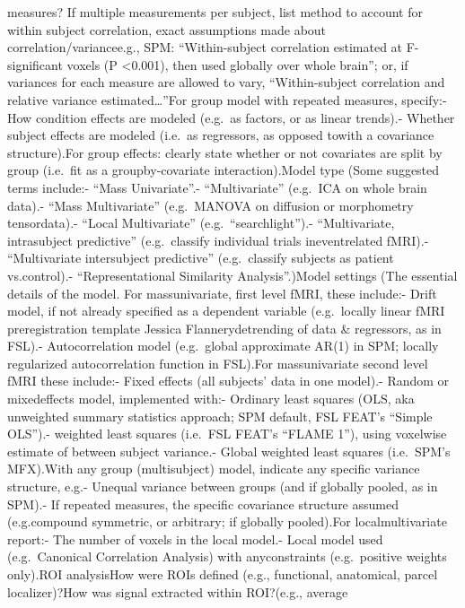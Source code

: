 \documentclass[]{article}
\begin{document}
measures? If multiple measurements per subject, list method to account
for within subject correlation, exact assumptions made about
correlation/variancee.g., SPM: ``Within-subject correlation estimated at
F-significant voxels (P \textless{}0.001), then used globally over whole
brain''; or, if variances for each measure are allowed to vary,
``Within-subject correlation and relative variance
estimated\ldots{}''For group model with repeated measures, specify:- How
condition effects are modeled (e.g.~as factors, or as linear trends).-
Whether subject effects are modeled (i.e.~as regressors, as opposed
towith a covariance structure).For group effects: clearly state whether
or not covariates are split by group (i.e.~fit as a groupby-covariate
interaction).Model type (Some suggested terms include:- ``Mass
Univariate''.- ``Multivariate'' (e.g.~ICA on whole brain data).- ``Mass
Multivariate'' (e.g.~MANOVA on diffusion or morphometry tensordata).-
``Local Multivariate'' (e.g.~``searchlight'').- ``Multivariate,
intrasubject predictive'' (e.g.~classify individual trials
ineventrelated fMRI).- ``Multivariate intersubject predictive''
(e.g.~classify subjects as patient vs.control).- ``Representational
Similarity Analysis''.)Model settings (The essential details of the
model. For massunivariate, first level fMRI, these include:- Drift
model, if not already specified as a dependent variable (e.g.~locally
linear fMRI preregistration template \textbar{} Jessica
Flannerydetrending of data \& regressors, as in FSL).- Autocorrelation
model (e.g.~global approximate AR(1) in SPM; locally regularized
autocorrelation function in FSL).For massunivariate second level fMRI
these include:- Fixed effects (all subjects' data in one model).- Random
or mixedeffects model, implemented with:- Ordinary least squares (OLS,
aka unweighted summary statistics approach; SPM default, FSL FEAT's
``Simple OLS'').- weighted least squares (i.e.~FSL FEAT's ``FLAME 1''),
using voxelwise estimate of between subject variance.- Global weighted
least squares (i.e.~SPM's MFX).With any group (multisubject) model,
indicate any specific variance structure, e.g.- Unequal variance between
groups (and if globally pooled, as in SPM).- If repeated measures, the
specific covariance structure assumed (e.g.compound symmetric, or
arbitrary; if globally pooled).For localmultivariate report:- The number
of voxels in the local model.- Local model used (e.g.~Canonical
Correlation Analysis) with anyconstraints (e.g.~positive weights
only).ROI analysisHow were ROIs defined (e.g., functional, anatomical,
parcel localizer)?How was signal extracted within ROI?(e.g., average
\end{document}
